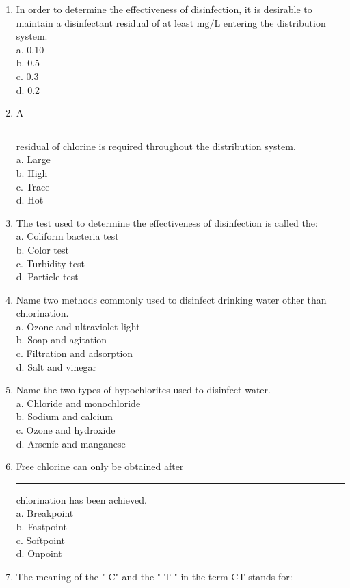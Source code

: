 \begin{enumerate}[1.]
\item In order to determine the effectiveness of disinfection, it is desirable to maintain a disinfectant residual of at least $\mathrm{mg} / \mathrm{L}$ entering the distribution system.\\
a. 0.10\\
b. 0.5\\
c. 0.3\\
d. 0.2\\
\item A \rule{1.5cm}{0.5pt} residual of chlorine is required throughout the distribution system.\\
a. Large\\
b. High\\
c. Trace\\
d. Hot\\
\item The test used to determine the effectiveness of disinfection is called the:\\
a. Coliform bacteria test\\
b. Color test\\
c. Turbidity test\\
d. Particle test\\
\item Name two methods commonly used to disinfect drinking water other than chlorination.\\
a. Ozone and ultraviolet light\\
b. Soap and agitation\\
c. Filtration and adsorption\\
d. Salt and vinegar\\
\item Name the two types of hypochlorites used to disinfect water.\\
a. Chloride and monochloride\\
b. Sodium and calcium\\
c. Ozone and hydroxide\\
d. Arsenic and manganese\\
\item Free chlorine can only be obtained after \rule{1.5cm}{0.5pt} chlorination has been achieved.\\
a. Breakpoint\\
b. Fastpoint\\
c. Softpoint\\
d. Onpoint\\
\item The meaning of the " C" and the " T " in the term CT stands for:\\

\end{enumerate}
